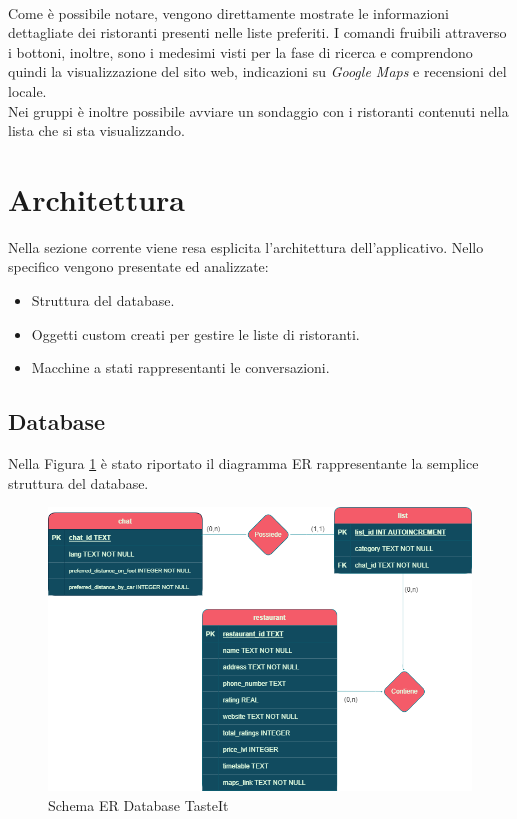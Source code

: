 \documentclass[a4paper, 12pt]{article}
\begin{document}
	\paragraph{}
	Come è possibile notare, vengono direttamente mostrate le informazioni dettagliate dei ristoranti presenti nelle liste preferiti. I comandi fruibili attraverso i bottoni, inoltre, sono i medesimi visti per la fase di ricerca e comprendono quindi la visualizzazione del sito web, indicazioni su \textit{Google Maps} e recensioni del locale.\\
	Nei gruppi è inoltre possibile avviare un sondaggio con i ristoranti contenuti nella lista che si sta visualizzando.
	
	
	\newpage
	\section{Architettura}
	Nella sezione corrente viene resa esplicita l'architettura dell'applicativo. Nello specifico vengono presentate ed analizzate:
	\begin{itemize}
		\item Struttura del database.
		\item Oggetti custom creati per gestire le liste di ristoranti.
		\item Macchine a stati rappresentanti le conversazioni.
	\end{itemize}
	\subsection{Database}
	Nella Figura \ref{fig:ER_image} è stato riportato il diagramma ER rappresentante la semplice struttura del database.
	\begin{figure}[h!]
		\centering
		\includegraphics[scale=0.62]{tasteItDb.png}
		\caption{Schema ER Database TasteIt}
		\label{fig:ER_image}
	\end{figure}
\end{document}
